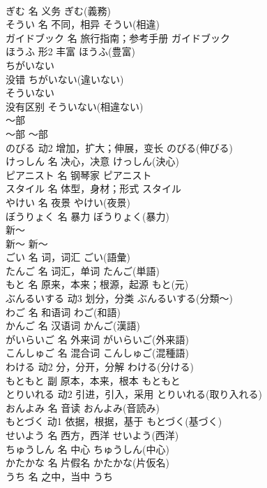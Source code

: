 \documentclass[8pt]{extreport}
\begin{document}
\begin{CJK}{UTF8}{min}
\\	ぎむ	名	义务	ぎむ(義務)	
\\	そうい	名	不同，相异	そうい(相違)	
\\	ガイドブック	名	旅行指南；参考手册	ガイドブック	
\\	ほうふ	形2	丰富	ほうふ(豊富)	
\\	ちがいない	
\\	没错	ちがいない(違いない)	
\\	そういない	
\\	没有区别	そういない(相違ない)	
\\	～部	
\\	～部	～部	
\\	のびる	动2	增加，扩大；伸展，变长	のびる(伸びる)	
\\	けっしん	名	决心，决意	けっしん(決心)	
\\	ピアニスト	名	钢琴家	ピアニスト	
\\	スタイル	名	体型，身材；形式	スタイル	
\\	やけい	名	夜景	やけい(夜景)	
\\	ぼうりょく	名	暴力	ぼうりょく(暴力)	
\\	新～	
\\	新～	新～	
\\	ごい	名	词，词汇	ごい(語彙)	
\\	たんご	名	词汇，单词	たんご(単語)	
\\	もと	名	原来，本来；根源，起源	もと(元)	
\\	ぶんるいする	动3	划分，分类	ぶんるいする(分類～)	
\\	わご	名	和语词	わご(和語)	
\\	かんご	名	汉语词	かんご(漢語)	
\\	がいらいご	名	外来词	がいらいご(外来語)	
\\	こんしゅご	名	混合词	こんしゅご(混種語)	
\\	わける	动2	分，分开，分解	わける(分ける)	
\\	もともと	副	原本，本来，根本	もともと	
\\	とりいれる	动2	引进，引入，采用	とりいれる(取り入れる)	
\\	おんよみ	名	音读	おんよみ(音読み)	
\\	もとづく	动1	依据，根据，基于	もとづく(基づく)	
\\	せいよう	名	西方，西洋	せいよう(西洋)	
\\	ちゅうしん	名	中心	ちゅうしん(中心)	
\\	かたかな	名	片假名	かたかな(片仮名)	
\\	うち	名	之中，当中	うち	

\end{CJK}
\end{document}

